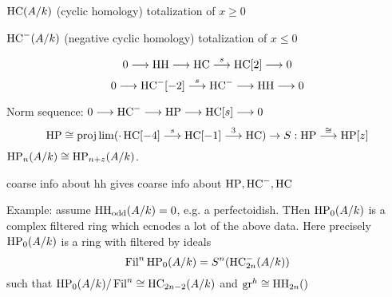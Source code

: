 $\hc(A/k)$ (cyclic homology) totalization of $x \geq 0$

$\hc^-(A/k)$ (negative cyclic homology) totalization of $x \leq 0$ 

	\[
	0 \ma{} \hh \ma{} \hc \ma{s} \hc[2] \ma{} 0
	\]
	\[
	0 \ma{} \hc^-[-2] \ma{s} \hc^- \ma{} \hh \ma{} 0
	\]

Norm sequence: $0 \ma{} \hc^- \ma{} \hp \ma{} \hc[s] \ma{} 0$
	\[
	\hp \cong \projlim (\cdot \hc[-4] \ma{s} \hc[-1] \ma{3} \hc) \to S: \hp \ma{\cong} \hp[z]
	\]
$\hp_n(A/k) \cong \hp_{n+z}(A/k)$. 


coarse info about hh gives coarse info about $\hp, \hc^-,\hc$

Example: assume $\hh_\text{odd}(A/k)=0$, e.g. a perfectoidish. THen $\hp_0(A/k)$ is a complex filtered ring which ecnodes a lot of the above data. Here precisely $\hp_0(A/k)$ is a ring with filtered by ideals
	\[
	\fil^n \hp_0(A/k)= S^n(\hc_{2n}^-(A/k))
	\]
such that $\hp_0(A/k)/\fil^n \cong \hc_{2n-2}(A/k)$
and $\text{gr}^h \cong \hh_{2n}()$




















